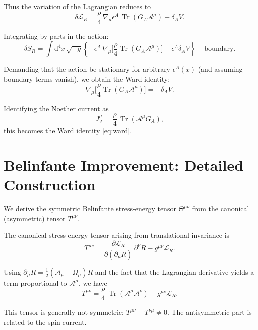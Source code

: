 \documentclass[11pt,a4paper]{article}
\numberwithin{equation}{section}
\theoremstyle{plain}
\theoremstyle{definition}
\theoremstyle{remark}
\DeclareMathOperator{\Tr}{Tr}
\newcommand{\dd}{\mathrm{d}}
\begin{document}
Thus the variation of the Lagrangian reduces to
\begin{equation}
\delta \mathcal{L}_R = \frac{\rho}{4}\,\nabla_\mu \epsilon^A\,\Tr(G_A\mathcal{A}^\mu) - \delta_A V.
\end{equation}

Integrating by parts in the action:
\begin{equation}
\delta S_R = \int \dd^4x\,\sqrt{-g}\left\{-\epsilon^A\,\nabla_\mu\!\Big[\frac{\rho}{4}\Tr(G_A\mathcal{A}^\mu)\Big] - \epsilon^A \delta_A V\right\} + \text{boundary}.
\end{equation}

Demanding that the action be stationary for arbitrary $\epsilon^A(x)$ (and assuming boundary terms vanish), we obtain the Ward identity:
\begin{equation}
\nabla_\mu\!\Big[\frac{\rho}{4}\Tr(G_A\mathcal{A}^\mu)\Big] = -\delta_A V.
\end{equation}

Identifying the Noether current as
\begin{equation}
J^\mu_A = \frac{\rho}{4}\,\Tr(\mathcal{A}^\mu G_A),
\end{equation}
this becomes the Ward identity \eqref{eq:ward}.

\section{Belinfante Improvement: Detailed Construction}
\label{app:belinfante}

We derive the symmetric Belinfante stress-energy tensor $\Theta^{\mu\nu}$ from the canonical (asymmetric) tensor $T^{\mu\nu}$.

The canonical stress-energy tensor arising from translational invariance is
\begin{equation}
T^{\mu\nu} = \frac{\partial \mathcal{L}_R}{\partial(\partial_\mu R)}\,\partial^\nu R - g^{\mu\nu}\mathcal{L}_R.
\end{equation}

Using $\partial_\mu R = \frac{1}{2}(\mathcal{A}_\mu - \Omega_\mu)R$ and the fact that the Lagrangian derivative yields a term proportional to $\mathcal{A}^\mu$, we have
\begin{equation}
T^{\mu\nu} = \frac{\rho}{4}\,\Tr(\mathcal{A}^\mu\mathcal{A}^\nu) - g^{\mu\nu}\mathcal{L}_R.
\end{equation}

This tensor is generally not symmetric: $T^{\mu\nu} - T^{\nu\mu} \neq 0$. The antisymmetric part is related to the spin current.
\end{document}
